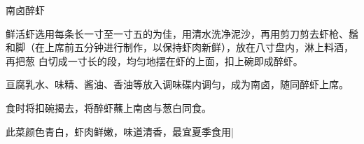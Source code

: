 \begin{recipe}{南卤醉虾}

\ingredients


\cooking

\step 鲜活虾选用每条长一寸至一寸五的为佳，用清水洗净泥沙，再用剪刀剪去虾枪、鬚
和脚（在上席前五分钟进行制作，以保持虾肉新鲜），放在八寸盘内，淋上料酒，再把葱
白切成一寸长的段，均匀地摆在虾的上面，扣上碗即成醉虾。

\step 亘腐乳水、味精、酱油、香油等放入调味碟内调匀，成为南卤，随同醉虾上席。

\step 食时将扣碗揭去，将醉虾蘸上南卤与葱白同食。

\notes

此菜颜色青白，虾肉鲜嫩，味道清香，最宜夏季食用|

\end{recipe}

